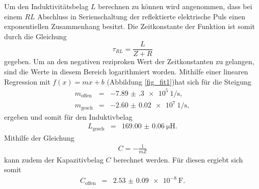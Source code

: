 Um den Induktivitätsbelag $L$ berechnen zu können wird angenommen, dass bei einem $RL$ Abschluss in Serienschaltung der reflektierte elektrische Puls einen exponentiellen Zusammenhang besitzt.
Die Zeitkonstante der Funktion ist somit durch die Gleichung
\begin{equation*}
	\tau_{RL} = \frac{L}{Z+R}
\end{equation*}
gegeben.
Um an den negativen reziproken Wert der Zeitkonstanten zu gelangen, sind die Werte in diesem Bereich logarithmiert worden.
Mithilfe einer linearen Regression mit $f(x)=mx+b$ (Abbildung \ref{fig_fit1})hat sich für die Steigung
\begin{eqnarray*}
	m_\text{offen} &=& \SI{-7.89(30)e5}{1\per\second},\\
	m_\text{gesch} &=& \SI{-2.60(2)e7}{1\per\second},
\end{eqnarray*}
ergeben und somit für den Induktivbelag
\begin{eqnarray*}
	L_\text{gesch} &=& \SI{169.00(6)}{\micro\henry}.
\end{eqnarray*}
Mithilfe der Gleichung
\begin{eqnarray*}
	C = -\frac{1}{mZ}
\end{eqnarray*}
kann zudem der Kapazitivbelag $C$ berechnet werden.
Für diesen ergiebt sich somit
\begin{eqnarray*}
	C_\text{offen} &=& \SI{2.53(9)e-8}{\farad}.
\end{eqnarray*}

